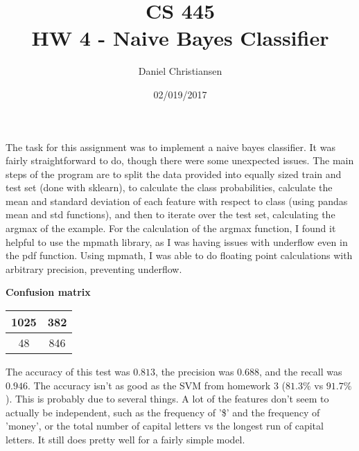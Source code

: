 \documentclass{article}
\title{CS 445 \\ HW 4 - Naive Bayes Classifier}
\author{Daniel Christiansen}
\date{02/019/2017}
\begin{document}
\maketitle

\clearpage

\begin{flushleft}
The task for this assignment was to implement a naive bayes classifier.  It was fairly straightforward to do, though there were some unexpected issues.  The main steps of the program are to split the data provided into equally sized train and test set (done with sklearn), to calculate the class probabilities, calculate the mean and standard deviation of each feature with respect to class (using pandas mean and std functions),  and then to iterate over the test set, calculating the argmax of the example.  For the calculation of the argmax function, I found it helpful to use the mpmath library, as I was having issues with underflow even in the pdf function.  Using mpmath, I was able to do floating point calculations with arbitrary precision, preventing underflow.
\end{flushleft}

\begin{table}[h!]
    \begin{center}
        \centerline\textbf{{Confusion matrix}}
        \begin{tabular}{| c | c |}
            \hline
            1025 & 382 \\ 
            \hline
            48 & 846 \\  
            \hline
        \end{tabular}
    \end{center}
\end{table}

\begin{flushleft}
The accuracy of this test was $0.813$, the precision was $0.688$, and the recall was $0.946$.  The accuracy isn't as good as the SVM from homework 3 ($81.3\%$ vs $91.7\%$).  This is probably due to several things.  A lot of the features don't seem to actually be independent, such as the frequency of '\$' and the frequency of 'money', or the total number of capital letters vs the longest run of capital letters.  It still does pretty well for a fairly simple model.  
\end{flushleft}
\end{document}
